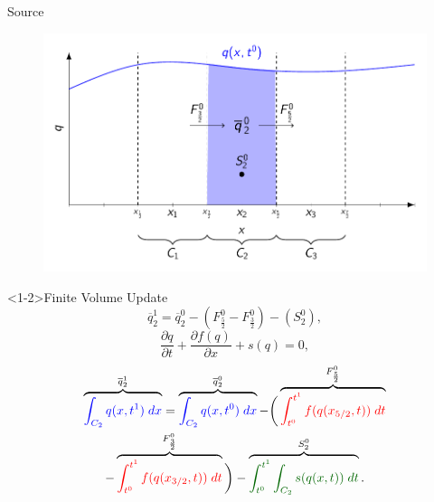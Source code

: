 \documentclass[]{beamer}
\begin{document}
\begin{frame}{Source}
	\begin{figure}
		\includegraphics[width=\textwidth]{./Pics/FVMpicture/TotalFluxInOutSource.pdf}
	\end{figure}
\end{frame}
\begin{frame}<1-2>{Finite Volume Update}
	\begin{equation*}
	\overline{q}^1_2 = \overline{q}^0_2 - \left(F^0_{\frac{5}{2}} - F^0_{\frac{3}{2}}\right) - \left(S^0_2\right),
	\end{equation*}	
	\pause
	\begin{equation*}
	\frac{\partial q}{\partial t} + \frac{\partial f(q)}{\partial x} + s(q) = 0,
	\end{equation*}	
	\pause
	\begin{multline*}
	\overbrace{ {\color{blue}\int_{C_2} q(x,t^1) \; dx}}^{\overline{q}^1_2} = \overbrace{ {\color{blue}\int_{C_2} q(x,t^0) \; dx } }^{\overline{q}^0_2} -  \bigg( \overbrace{ {\color{red}\int_{t^0}^{t^1} f(q(x_{5/2},t)) \; dt}}^{F^0_{\frac{5}{2}}} \\- \overbrace{{\color{red}\int_{t^0}^{t^1} f(q(x_{3/2},t)) \; dt}}^{F^0_{\frac{3}{2}}}  \bigg) -  \overbrace{ {\color{green!40!black}\int_{t^0}^{t^1} \int_{C_2} s(q(x,t)) \; dt }}^{S^0_{2}}.
	\end{multline*}
\end{frame}
\end{document}
